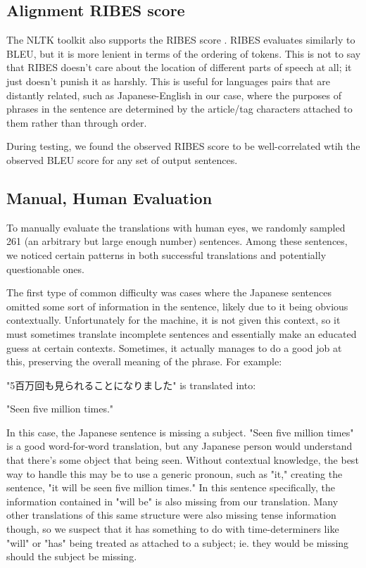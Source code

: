 \documentclass[11pt]{article}
\begin{document}
\subsection{Alignment RIBES score}

The NLTK toolkit also supports the RIBES score \cite{isozaki-etal-2010-automatic}. RIBES evaluates similarly to BLEU, but it is more lenient in terms of the ordering of tokens. This is not to say that RIBES doesn't care about the location of different parts of speech at all; it just doesn't punish it as harshly. This is useful for languages pairs that are distantly related, such as Japanese-English in our case, where the purposes of phrases in the sentence are determined by the article/tag characters attached to them rather than through order. 

During testing, we found the observed RIBES score to be well-correlated wtih the observed BLEU score for any set of output sentences.

\subsection{Manual, Human Evaluation}

To manually evaluate the translations with human eyes, we randomly sampled 261 (an arbitrary but large enough number) sentences. Among these sentences, we noticed certain patterns in both successful translations and potentially questionable ones. 

The first type of common difficulty was cases where the Japanese sentences omitted some sort of information in the sentence, likely due to it being obvious contextually. Unfortunately for the machine, it is not given this context, so it must sometimes translate incomplete sentences and essentially make an educated guess at certain contexts. Sometimes, it actually manages to do a good job at this, preserving the overall meaning of the phrase. For example: 

"5百万回も見られることになりました"  is translated into: 

"Seen five million times."

In this case, the Japanese sentence is missing a subject. "Seen five million times" is a good word-for-word translation, but any Japanese person would understand that there's some object that being seen. Without contextual knowledge, the best way to handle this may be to use a generic pronoun, such as "it," creating the sentence, "it will be seen five million times." In this sentence specifically, the information contained in "will be" is also missing from our translation. Many other translations of this same structure were also missing tense information though, so we suspect that it has something to do with time-determiners like "will" or "has" being treated as attached to a subject; ie. they would be missing should the subject be missing.
\end{document}
